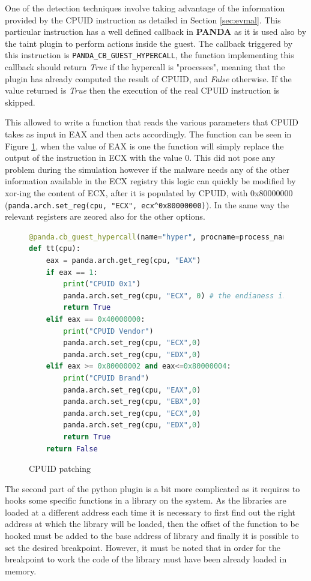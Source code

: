 One of the detection techniques involve taking advantage of the information provided by the CPUID instruction as detailed in Section \ref{sec:evmal}. This particular instruction has a well defined callback in \textbf{PANDA} as it is used also by the taint plugin to perform actions inside the guest. The callback triggered by this instruction is \lstinline{PANDA_CB_GUEST_HYPERCALL}, the function implementing this callback should return \textit{True} if the hypercall is "processes", meaning that the plugin has already computed the result of CPUID, and \textit{False} otherwise. If the value returned is \textit{True} then the execution of the real CPUID instruction is skipped.

This allowed to write a function that reads the various parameters that CPUID takes as input in EAX and then acts accordingly. The function can be seen in Figure \ref{fig:cpuidpat}, when the value of EAX is one the function will simply replace the output of the instruction in ECX with the value 0. This did not pose any problem during the simulation however if the malware needs any of the other information available in the ECX registry this logic can quickly be modified by xor-ing the content of ECX, after it is populated by CPUID, with 0x80000000 (\lstinline{panda.arch.set_reg(cpu, "ECX", ecx^0x80000000)}). In the same way the relevant registers are zeored also for the other options.

\begin{figure}[htp]
\centering
\begin{lstlisting}[language=Python] 
@panda.cb_guest_hypercall(name="hyper", procname=process_name)
def tt(cpu):
    eax = panda.arch.get_reg(cpu, "EAX")
    if eax == 1:
        print("CPUID 0x1")
        panda.arch.set_reg(cpu, "ECX", 0) # the endianess is swapped (?)
        return True
    elif eax == 0x40000000:
        print("CPUID Vendor")
        panda.arch.set_reg(cpu, "ECX",0)
        panda.arch.set_reg(cpu, "EDX",0)
    elif eax >= 0x80000002 and eax<=0x80000004:
        print("CPUID Brand")
        panda.arch.set_reg(cpu, "EAX",0)
        panda.arch.set_reg(cpu, "EBX",0)
        panda.arch.set_reg(cpu, "ECX",0)
        panda.arch.set_reg(cpu, "EDX",0)
        return True
    return False
\end{lstlisting}
\caption{CPUID patching}
\label{fig:cpuidpat}
\end{figure}

The second part of the python plugin is a bit more complicated as it requires to hooks some specific functions in a library on the system. As the libraries are loaded at a different address each time it is necessary to first find out the right address at which the library will be loaded, then the offset of the function to be hooked must be added to the base address of library and finally it is possible to set the desired breakpoint. However, it must be noted that in order for the breakpoint to work the code of the library must have been already loaded in memory. 


